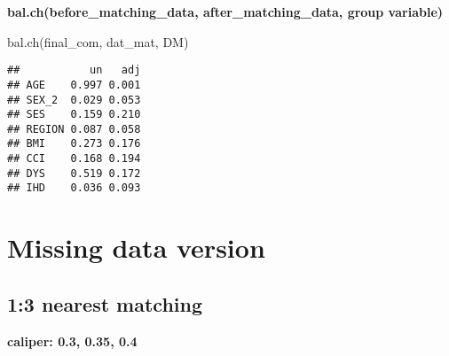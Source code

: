 \documentclass[
]{book}
\newenvironment{Shaded}{\begin{snugshade}}{\end{snugshade}}
\newcommand{\AttributeTok}[1]{\textcolor[rgb]{0.77,0.63,0.00}{#1}}
\newcommand{\ControlFlowTok}[1]{\textcolor[rgb]{0.13,0.29,0.53}{\textbf{#1}}}
\newcommand{\DecValTok}[1]{\textcolor[rgb]{0.00,0.00,0.81}{#1}}
\newcommand{\DocumentationTok}[1]{\textcolor[rgb]{0.56,0.35,0.01}{\textbf{\textit{#1}}}}
\newcommand{\FloatTok}[1]{\textcolor[rgb]{0.00,0.00,0.81}{#1}}
\newcommand{\FunctionTok}[1]{\textcolor[rgb]{0.00,0.00,0.00}{#1}}
\newcommand{\NormalTok}[1]{#1}
\newcommand{\OtherTok}[1]{\textcolor[rgb]{0.56,0.35,0.01}{#1}}
\newcommand{\SpecialCharTok}[1]{\textcolor[rgb]{0.00,0.00,0.00}{#1}}
\newcommand{\StringTok}[1]{\textcolor[rgb]{0.31,0.60,0.02}{#1}}
\begin{document}
\textbf{bal.ch(before\_matching\_data, after\_matching\_data, group variable)}

\begin{Shaded}
\begin{Highlighting}[]
\FunctionTok{bal.ch}\NormalTok{(final\_com, dat\_mat, DM)}
\end{Highlighting}
\end{Shaded}

\begin{verbatim}
##           un   adj
## AGE    0.997 0.001
## SEX_2  0.029 0.053
## SES    0.159 0.210
## REGION 0.087 0.058
## BMI    0.273 0.176
## CCI    0.168 0.194
## DYS    0.519 0.172
## IHD    0.036 0.093
\end{verbatim}

\hypertarget{missing-data-version}{%
\section{Missing data version}\label{missing-data-version}}

\hypertarget{nearest-matching-1}{%
\subsection{1:3 nearest matching}\label{nearest-matching-1}}

\textbf{caliper: 0.3, 0.35, 0.4}

\begin{Shaded}
\end{Shaded}
\end{document}
